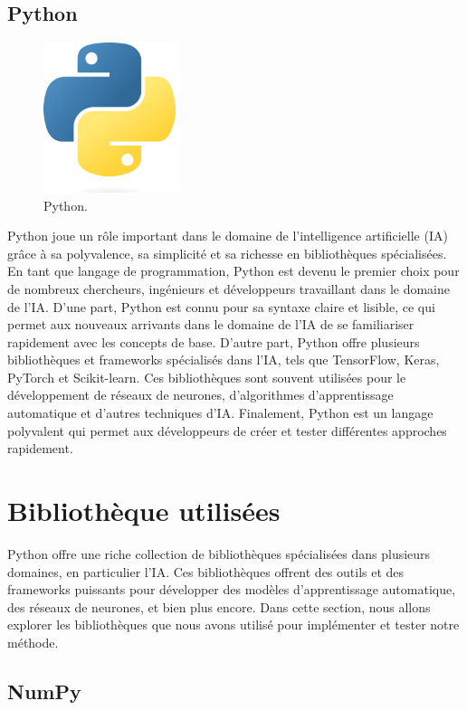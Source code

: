 \subsection{Python}

\begin{figure}[hbt!]
  \centering
  \includegraphics[width=4cm]{images_pfe/python.png}
  \caption{Python.}
  \label{fig:python}
\end{figure}
\FloatBarrier
\medskip

Python joue un rôle important dans le domaine de l'intelligence artificielle (IA) grâce à sa polyvalence, sa simplicité et sa richesse en bibliothèques spécialisées. En tant que langage de programmation, Python est devenu le premier choix  pour de nombreux chercheurs, ingénieurs et développeurs travaillant dans le domaine de l'IA. D'une part, Python est connu pour sa syntaxe claire et lisible, ce qui  permet aux nouveaux arrivants dans le domaine de l'IA de se familiariser rapidement avec les concepts de base. D'autre part, Python offre plusieurs bibliothèques et frameworks spécialisés dans l'IA, tels que TensorFlow, Keras, PyTorch et Scikit-learn. Ces bibliothèques sont souvent utilisées pour le développement de réseaux de neurones, d'algorithmes d'apprentissage automatique et d'autres techniques d'IA. Finalement, Python est un langage polyvalent qui permet aux développeurs de créer et tester différentes approches rapidement.

\section{Bibliothèque utilisées}
Python offre une riche collection de bibliothèques spécialisées dans plusieurs domaines, en particulier l'IA. Ces bibliothèques offrent des outils et des frameworks puissants pour développer des modèles d'apprentissage automatique, des réseaux de neurones, et bien plus encore. Dans cette section, nous allons explorer les bibliothèques que nous avons utilisé pour implémenter et tester notre méthode.
\subsection{NumPy}

